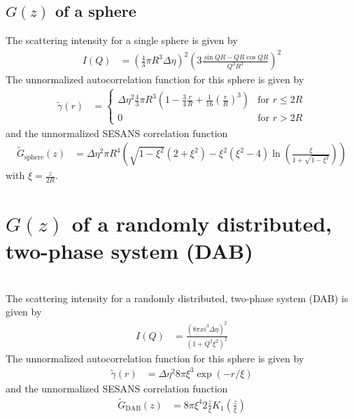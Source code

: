 \subsection{$G(z)$ of a sphere}
The scattering intensity for a single sphere is given by
\begin{align}
I(Q) &= \left(\frac{4}{3}\pi R^3 \Delta\eta\right)^2 \left(3\frac{\sin QR-QR\cos QR}{Q^3R^3}\right)^2
\end{align}
The unnormalized autocorrelation function for this sphere is given by
\begin{align}
\tilde{\gamma}(r) &=
\begin{cases}
 \Delta\eta^2  \frac{4}{3}\pi R^3 \left( 1-\frac{3}{4}\frac{r}{R}+\frac{1}{16}\left(\frac{r}{R}\right)^3\right) & \mbox{for } r\leq 2R \\
0 & \mbox{for }  r>2R
\end{cases}
\end{align}
and the unnormalized SESANS correlation function
\begin{align}
\tilde{G}_\mathrm{sphere}(z)&= \Delta\eta^2 \pi R^4 \left(\sqrt{1-\xi^2}(2+\xi^2)-\xi^2(\xi^2-4)\ln\left(\frac{\xi}{1+\sqrt{1-\xi^2}}\right)\right)
\end{align}
with $\xi=\frac{z}{2R}$.

\section{$G(z)$ of a randomly distributed, two-phase system (DAB) }~\\
The scattering intensity for a randomly distributed, two-phase system (DAB) is given by
\cite{DebyeBueche1949,DAB1957,Andersson2008}
\begin{align}
I(Q) &= \frac{\left(8 \pi xi^3 \Delta\eta\right)^2}{ \left(1+Q^2\xi^2\right)^2}
\end{align}
The unnormalized autocorrelation function for this sphere is given by
\begin{align}
\tilde{\gamma}(r) &=
 \Delta\eta^2 8\pi\xi^3 \exp\left( -r/\xi\right)
\end{align}
and the unnormalized SESANS correlation function
\begin{align}
\tilde{G}_\mathrm{DAB}(z)&= 8\pi\xi^4 2\frac{z}{\xi}K_1\left(\frac{z}{\xi}\right)
\end{align}

